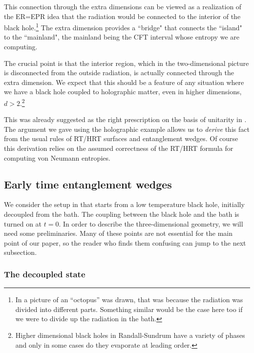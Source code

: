 \documentclass[11pt]{article}
\def\la{\label}
\begin{document}
This connection through the extra dimensions can be viewed as a realization of the ER=EPR idea that the radiation would be connected to the interior of the black hole.\footnote{In \cite{Maldacena:2013xja} a picture of an ``octopus'' was drawn, that was because the radiation was divided into different parts. Something similar would be the case here too if we were to divide up the radiation in the bath.} 
The extra dimension provides a ``bridge" that connects the ``island" to the ``mainland", the mainland being the CFT interval whose entropy we are computing.
  
The crucial point is that the interior region, which in the two-dimensional picture is disconnected from the outside radiation,  is actually connected through the extra dimension. We expect that this should be a feature of any situation where we have a black hole coupled to holographic matter, even in higher dimensions, $d>2$.\footnote{Higher dimensional black holes in Randall-Sundrum have a variety of phases \cite{Hubeny:2009ru,Figueras:2011gd,Santos:2012he,Santos:2014yja} and only in some cases do they evaporate at leading order.}

This was already suggested as the right prescription on the basis of unitarity in \cite{Hayden:2018khn,Penington:2019npb}. The argument we gave using the holographic example allows us to {\it derive} this fact from the usual rules of RT/HRT surfaces and entanglement wedges. Of course this derivation relies on the assumed correctness of the RT/HRT formula for computing von Neumann entropies. 

\subsection{Early time entanglement wedges}
 
We consider the setup in \cite{Almheiri:2019psf} that starts from a low temperature black hole, initially decoupled from the bath. 
The coupling between the black hole and the bath is turned on at $t=0$.
In order to describe the three-dimensional geometry, we will need some preliminaries.
Many of these points are not essential for the main point of our paper, so the reader who finds them confusing can jump to the next subsection.
   
\subsubsection{The decoupled state}
\la{CFTwB} 
   
\end{document}
